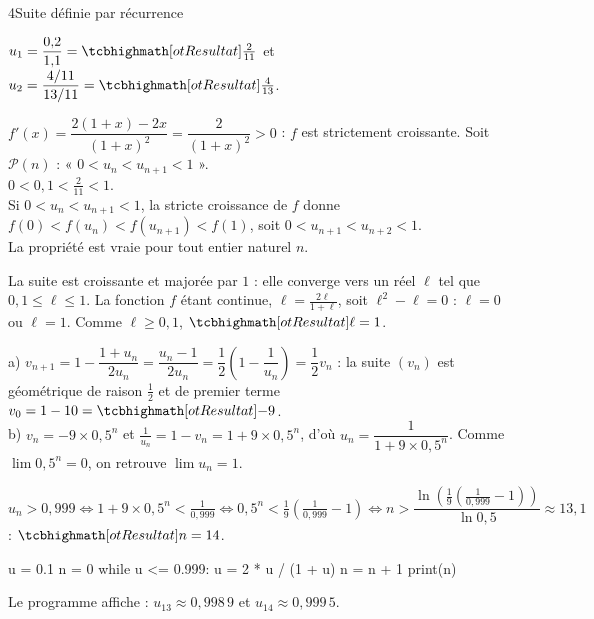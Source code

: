 \begin{corrigeBac}{4}{Suite définie par récurrence}
\begin{questions}
  \item $u_1=\dfrac{0{,}2}{1{,}1}=\res{\tfrac{2}{11}}$ et $u_2=\dfrac{4/11}{13/11}=\res{\tfrac{4}{13}}$. 
  \item $f'(x)=\dfrac{2(1+x)-2x}{(1+x)^{2}}=\dfrac{2}{(1+x)^{2}}>0$ : $f$ est strictement croissante. Soit $\mathcal{P}(n)$ :
    « $0<u_n<u_{n+1}<1$ ».\\
     $0<0{,}1<\frac2{11}<1$.\\
     Si $0<u_n<u_{n+1}<1$, la stricte croissance de $f$ donne $f(0)<f(u_n)<f(u_{n+1})<f(1)$, soit
    $0<u_{n+1}<u_{n+2}<1$.\\
     La propriété est vraie pour tout entier naturel $n$. \pts{1 pt}
  \item La suite est croissante et majorée par $1$ : elle converge vers un réel $\ell$ tel que $0{,}1\leq\ell\leq1$. La fonction $f$ étant
    continue, $\ell=\frac{2\ell}{1+\ell}$, soit $\ell^{2}-\ell=0$ : $\ell=0$ ou $\ell=1$. Comme $\ell\geq0{,}1$, $\res{\ell=1}$. \pts{1 pt}
  \item a) $v_{n+1}=1-\dfrac{1+u_n}{2u_n}=\dfrac{u_n-1}{2u_n}=\dfrac12\left(1-\dfrac1{u_n}\right)=\dfrac12v_n$ : la suite $(v_n)$ est
    géométrique de raison $\frac12$ et de premier terme $v_0=1-10=\res{-9}$.\\
    b) $v_n=-9\times0{,}5^{n}$ et $\frac1{u_n}=1-v_n=1+9\times0{,}5^{n}$, d'où $u_n=\dfrac{1}{1+9\times0{,}5^{n}}$. Comme
    $\lim0{,}5^{n}=0$, on retrouve $\lim u_n=1$. \pts{1 pt}
  \item $u_n>0{,}999\iff1+9\times0{,}5^{n}<\frac{1}{0{,}999}\iff0{,}5^{n}<\frac19\left(\frac{1}{0{,}999}-1\right)\iff
    n>\dfrac{\ln\left(\frac19\left(\frac1{0{,}999}-1\right)\right)}{\ln0{,}5}\approx13{,}1$ : $\res{n=14}$.
\begin{codecote}[0.42]
\begin{pythoncol}
u = 0.1
n = 0
while u <= 0.999:
    u = 2 * u / (1 + u)
    n = n + 1
print(n)
\end{pythoncol}
\cote
Le programme affiche  : $u_{13}\approx0{,}998\,9$ et $u_{14}\approx0{,}999\,5$.
\end{codecote}
\end{questions}
\end{corrigeBac}


